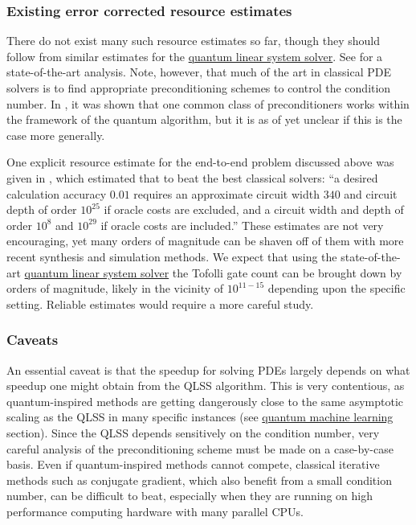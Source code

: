 \begin{refsection}
\subsubsection*{Existing error corrected resource estimates}
There do not exist many such resource estimates so far, though they should follow from similar estimates for the \hyperref[prim:QuantumLinearSystemSolvers]{quantum linear system solver}. See \cite{costa2021OptimalLinearSystem, jennings2023QLSS} for a state-of-the-art analysis. 
Note, however, that much of the art in classical PDE solvers is to find appropriate preconditioning schemes to control the condition number. In \cite{clader2013preconditioned}, it was shown that one common class of preconditioners works within the framework of the quantum algorithm, but it is as of yet unclear if this is the case more generally. 

One explicit resource estimate for the end-to-end problem discussed above was given in \cite{scherer2017concrete}, which estimated that to beat the best classical solvers: ``a desired calculation accuracy $0.01$ requires an approximate circuit width $340$ and circuit depth of order $10^{25}$ if oracle costs are excluded, and a circuit width and depth of order $10^8$ and $10^{29}$ if oracle costs are included.'' 
These estimates are not very encouraging, yet many orders of magnitude can be shaven off of them with more recent synthesis and simulation methods. We expect that using the state-of-the-art \hyperref[prim:QuantumLinearSystemSolvers]{quantum linear system solver} 
the Tofolli gate count can be brought down by orders of magnitude, likely in the vicinity of $10^{11-15}$ depending upon the specific setting.  
Reliable estimates would require a more careful study. 


\subsubsection*{Caveats}


An essential caveat is that the speedup for solving PDEs largely depends on what speedup one might obtain from the QLSS algorithm. This is very contentious, as quantum-inspired methods \cite{tang2018QInspiredClassAlgPCA} are getting dangerously close to the same asymptotic scaling as the QLSS in many specific instances (see \hyperref[appl:ClassicalML]{quantum machine learning} section). Since the QLSS depends sensitively on the condition number, very careful analysis of the preconditioning scheme must be made on a case-by-case basis. Even if quantum-inspired methods cannot compete, classical iterative methods such as conjugate gradient, which also benefit from a small condition number, can be difficult to beat, especially when they are running on high performance computing hardware with many parallel CPUs.




\end{refsection}
